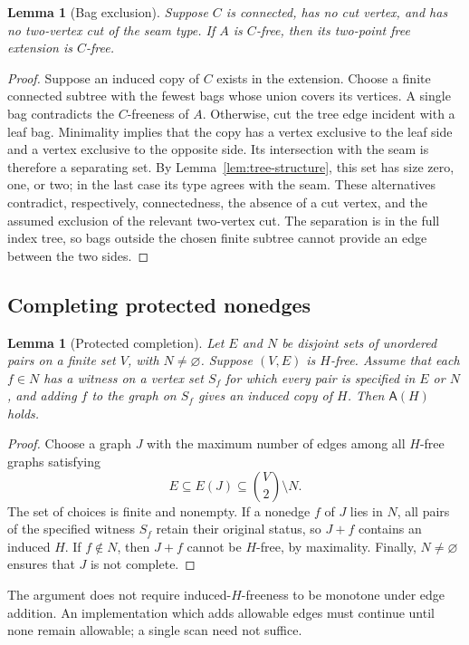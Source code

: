 \documentclass[10pt,a4paper]{amsart}
\newtheorem{lemma}[theorem]{Lemma}
\newcommand{\Asat}{\mathsf{A}}
\begin{document}
\begin{lemma}[Bag exclusion]\label{lem:bag-exclusion}
Suppose $C$ is connected, has no cut vertex, and has no two-vertex cut of the seam type. If $A$ is $C$-free, then its two-point free extension is $C$-free.
\end{lemma}
\begin{proof}
Suppose an induced copy of $C$ exists in the extension. Choose a finite connected subtree with the fewest bags whose union covers its vertices. A single bag contradicts the $C$-freeness of $A$. Otherwise, cut the tree edge incident with a leaf bag. Minimality implies that the copy has a vertex exclusive to the leaf side and a vertex exclusive to the opposite side. Its intersection with the seam is therefore a separating set. By Lemma~\ref{lem:tree-structure}, this set has size zero, one, or two; in the last case its type agrees with the seam. These alternatives contradict, respectively, connectedness, the absence of a cut vertex, and the assumed exclusion of the relevant two-vertex cut. The separation is in the full index tree, so bags outside the chosen finite subtree cannot provide an edge between the two sides.
\end{proof}

\subsection{Completing protected nonedges}

\begin{lemma}[Protected completion]\label{lem:completion}
Let $E$ and $N$ be disjoint sets of unordered pairs on a finite set $V$, with $N\ne\varnothing$. Suppose $(V,E)$ is $H$-free. Assume that each $f\in N$ has a witness on a vertex set $S_f$ for which every pair is specified in $E$ or $N$, and adding $f$ to the graph on $S_f$ gives an induced copy of $H$. Then $\Asat(H)$ holds.
\end{lemma}
\begin{proof}
Choose a graph $J$ with the maximum number of edges among all $H$-free graphs satisfying
\[
 E\subseteq E(J)\subseteq\binom V2\setminus N.
\]
The set of choices is finite and nonempty. If a nonedge $f$ of $J$ lies in $N$, all pairs of the specified witness $S_f$ retain their original status, so $J+f$ contains an induced $H$. If $f\notin N$, then $J+f$ cannot be $H$-free, by maximality. Finally, $N\ne\varnothing$ ensures that $J$ is not complete.
\end{proof}

The argument does not require induced-$H$-freeness to be monotone under edge addition. An implementation which adds allowable edges must continue until none remain allowable; a single scan need not suffice.
\end{document}
